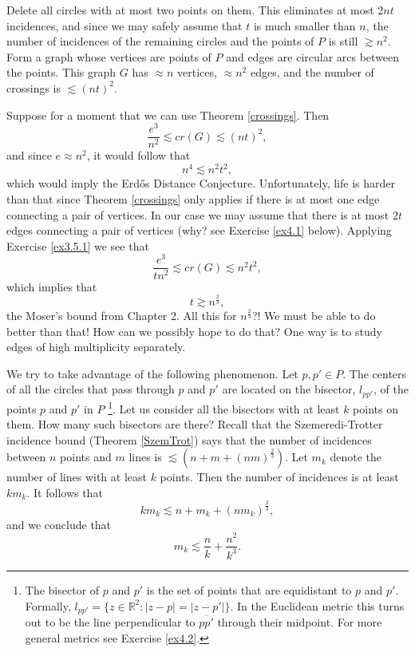 \documentclass[]{amsart}
\numberwithin{equation}{section}
\theoremstyle{plain}
\theoremstyle{definition}
\theoremstyle{remark}
\begin{document}
Delete all circles with at most two points on them. This eliminates at
most $2nt$
incidences, and since we may safely assume that $t$ is much smaller than $n$,
the number of incidences of the remaining circles and the points of
$P$ is still
$\gtrsim n^2$. Form a graph whose vertices are points of $P$ and edges are
circular arcs between the points. This graph $G$ has $\approx n$ vertices,
$\approx n^2$
edges, and the number of crossings is $\lesssim {(nt)}^2$.

Suppose for a moment that we can use Theorem \ref{crossings}. Then
\begin{equation}
\frac{e^3}{n^2} \lesssim cr(G) \lesssim {(nt)}^2,
\end{equation}
 and since
$e \approx n^2$, it would follow that
\begin{equation}
n^4 \lesssim n^2t^2,
\end{equation}
 which would imply the Erd\H{o}s Distance Conjecture.
Unfortunately, life is harder than that since Theorem \ref{crossings} only applies
if there is
at most one edge connecting a pair of vertices. In our case we may assume
that there is at most $2t$ edges connecting a pair of vertices (why? see
Exercise \ref{ex4.1} below). Applying Exercise \ref{ex3.5.1} we see that
\begin{equation}
\frac{e^3}{tn^2} \lesssim cr(G) \lesssim n^2t^2,
\end{equation}
 which
implies that \begin{equation}
 t \gtrsim n^{\frac{2}{3}},
\end{equation}
 the Moser's bound from Chapter 2. All this
for $n^{\frac{2}{3}}$?! We must be able to do better than that! How can we
possibly hope to do that? One way is to study edges of high multiplicity
separately.

We try to take advantage of the following phenomenon. Let $p, p'
\in P$. The centers of all the circles that pass through $p$ and
$p'$ are located on the bisector, $l_{pp'}$,  of the points $p$
and $p'$ in $P$ \footnote{The bisector of $p$ and $p'$ is the set
of points that are equidistant to $p$ and $p'$.  Formally,
$l_{pp'}= \{ z \in \mathbb{R}^2 : |z-p|=|z-p'| \}$.  In the
Euclidean metric this turns out to be the line perpendicular to
$\overline{pp'}$ through their midpoint.  For more general metrics
see Exercise \ref{ex4.2}.}.  Let us consider all the bisectors
with at least $k$ points on them. How many such bisectors are
there? Recall that the Szemeredi-Trotter incidence bound (Theorem
\ref{SzemTrot}) says that the number of incidences between $n$
points and $m$ lines is $\lesssim (n+m+{(nm)}^{\frac{2}{3}})$. Let
$m_k$ denote the number of lines with at least $k$ points. Then
the number of incidences is at least $km_k$. It follows that
\begin{equation}
km_k \lesssim n+m_k+{(nm_k)}^{\frac{2}{3}},
\end{equation}
 and we
conclude that
\begin{equation} \label{richlines}
m_k \lesssim \frac{n}{k}+\frac{n^2}{k^3}.
\end{equation}
\end{document}
